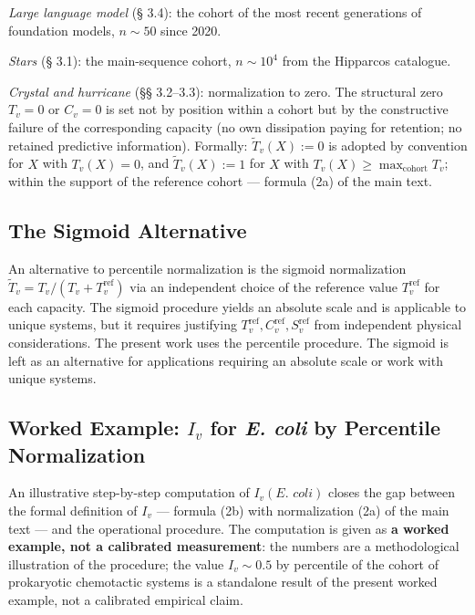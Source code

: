 \documentclass[pdflatex,sn-mathphys-ay]{sn-jnl}
\begin{document}
\emph{Large language model} (§ 3.4): the cohort of the most recent generations of foundation models, \(n \sim 50\) since 2020.

\emph{Stars} (§ 3.1): the main-sequence cohort, \(n \sim 10^4\) from the Hipparcos catalogue.

\emph{Crystal and hurricane} (§§ 3.2--3.3): normalization to zero. The structural zero \(T_v = 0\) or \(C_v = 0\) is set not by position within a cohort but by the constructive failure of the corresponding capacity (no own dissipation paying for retention; no retained predictive information). Formally: \(\tilde{T}_v(X) := 0\) is adopted by convention for \(X\) with \(T_v(X) = 0\), and \(\tilde{T}_v(X) := 1\) for \(X\) with \(T_v(X) \ge \max_{\text{cohort}} T_v\); within the support of the reference cohort --- formula (2a) of the main text.

\subsection*{The Sigmoid Alternative}\label{the-sigmoid-alternative}

An alternative to percentile normalization is the sigmoid normalization \(\tilde{T}_v = T_v / (T_v + T_v^{\text{ref}})\) via an independent choice of the reference value \(T_v^{\text{ref}}\) for each capacity. The sigmoid procedure yields an absolute scale and is applicable to unique systems, but it requires justifying \(T_v^{\text{ref}}, C_v^{\text{ref}}, S_v^{\text{ref}}\) from independent physical considerations. The present work uses the percentile procedure. The sigmoid is left as an alternative for applications requiring an absolute scale or work with unique systems.

\subsection*{\texorpdfstring{Worked Example: \(I_v\) for \emph{E. coli} by Percentile Normalization}{Worked Example: I\_v for E. coli by Percentile Normalization}}\label{worked-example-i_v-for-e.-coli-by-percentile-normalization}

An illustrative step-by-step computation of \(I_v(\textit{E. coli})\) closes the gap between the formal definition of \(I_v\) --- formula (2b) with normalization (2a) of the main text --- and the operational procedure. The computation is given as \textbf{a worked example, not a calibrated measurement}: the numbers are a methodological illustration of the procedure; the value \(I_v \sim 0.5\) by percentile of the cohort of prokaryotic chemotactic systems is a standalone result of the present worked example, not a calibrated empirical claim.
\end{document}

